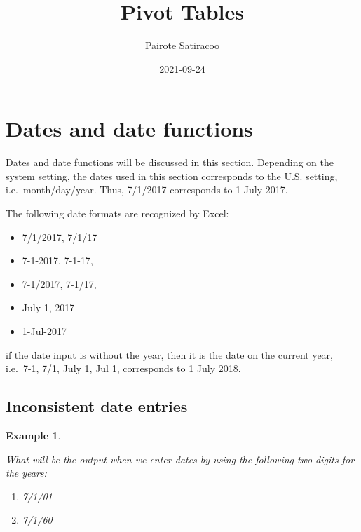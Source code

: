 \documentclass[
]{article}
\title{\textbf{Pivot Tables}}
\author{Pairote Satiracoo}
\date{2021-09-24}
\theoremstyle{definition}
\theoremstyle{definition}
\newtheorem{example}{Example}[section]
\theoremstyle{definition}
\theoremstyle{definition}
\theoremstyle{remark}
\begin{document}
\maketitle

{
\setcounter{tocdepth}{2}
\tableofcontents
}
\hypertarget{dates-and-date-functions}{%
\section{Dates and date functions}\label{dates-and-date-functions}}

Dates and date functions will be discussed in this section. Depending on
the system setting, the dates used in this section corresponds to the
U.S. setting, i.e.~month/day/year. Thus, 7/1/2017 corresponds to 1 July
2017.

The following date formats are recognized by Excel:

\begin{itemize}
\item
  7/1/2017, 7/1/17
\item
  7-1-2017, 7-1-17,
\item
  7-1/2017, 7-1/17,
\item
  July 1, 2017
\item
  1-Jul-2017
\end{itemize}

if the date input is without the year, then it is the date on the
current year, i.e.~7-1, 7/1, July 1, Jul 1, corresponds to 1 July 2018.

\hypertarget{inconsistent-date-entries}{%
\subsection{Inconsistent date entries}\label{inconsistent-date-entries}}

\begin{example}
\protect\hypertarget{exm:unlabeled-div-1}{}\label{exm:unlabeled-div-1}

\emph{What will be the output when we enter dates by using the
following two digits for the years:}

\begin{enumerate}
\def\labelenumi{\arabic{enumi}.}
\item
  \emph{7/1/01}
\item
  \emph{7/1/60}
\end{enumerate}

\end{example}
\end{document}
